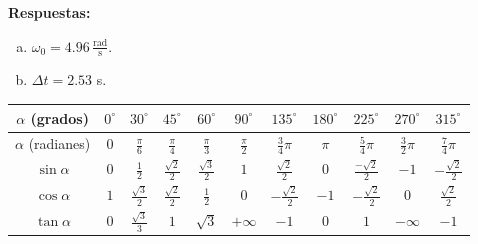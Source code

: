 \documentclass[addpoints]{exam}
\newcommand{\grado}[0]{^{\circ}}
\newcommand{\rtas}{\textbf{Respuestas: }}
\begin{document}
\begin{questions}

    \rtas
    \begin{enumerate}[a)]
        \item $\omega_0 = 4.96 \, \frac{\text{rad}}{\text{s}}$.
        \item $\Delta t = 2.53$ s.
    \end{enumerate}

\end{questions}

    \begin{table}[ht]
        \centering
        \begin{tabular}{|c|cccccccccc|}
            \hline
            $\alpha$ (grados)   & $0\grado$ &  $30\grado$ & $45\grado$ & $60\grado$ & $90\grado$ & $135\grado$ & $180\grado$ & $225\grado$ & $270\grado$ & $315\grado$ \\
            \hline
            $\alpha$ (radianes) &   $0$    &  $\frac{\pi}{6}$ & $\frac{\pi}{4}$ & $\frac{\pi}{3}$ & $\frac{\pi}{2}$ & $\frac{3}{4} \pi$ & $\pi$ & $\frac{5}{4} \pi$ & $\frac{3}{2} \pi$ & $\frac{7}{4} \pi$ \\
            \hline
            $\sin \alpha$       &   $0$    & $\frac{1}{2}$ & $\frac{\sqrt{2}}{2}$ & $\frac{\sqrt{3}}{2}$ & $1$ & $\frac{\sqrt{2}}{2}$ & $0$ & $\frac{-\sqrt{2}}{2}$ & $-1$ & $-\frac{\sqrt{2}}{2}$ \\
            $\cos \alpha$       &   $1$    & $\frac{\sqrt{3}}{2}$ & $\frac{\sqrt{2}}{2}$ & $\frac{1}{2}$ & $0$ & $-\frac{\sqrt{2}}{2}$ & $-1$ & $-\frac{\sqrt{2}}{2}$ & $0$ & $\frac{\sqrt{2}}{2}$ \\
            $\tan \alpha$       &   $0$    & $\frac{\sqrt{3}}{3}$ & $1$ & $\sqrt{3}$ & $+\infty$ & $-1$ & $0$ & $1$ & $-\infty$ & $-1$ \\
            \hline  
        \end{tabular}
    \end{table}
\end{document}
